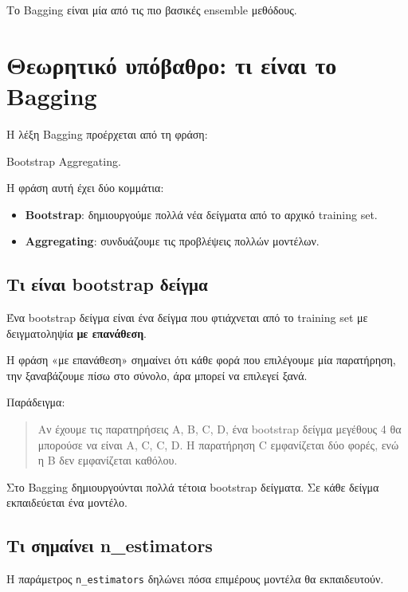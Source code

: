 \documentclass[12pt,a4paper]{article}
\newcommand{\code}[1]{\texttt{\textenglish{#1}}}
\begin{document}
Το Bagging είναι μία από τις πιο βασικές ensemble μεθόδους.

\section{Θεωρητικό υπόβαθρο: τι είναι το Bagging}

Η λέξη Bagging προέρχεται από τη φράση:

\begin{center}
\textenglish{Bootstrap Aggregating}.
\end{center}

Η φράση αυτή έχει δύο κομμάτια:

\begin{itemize}
    \item \textbf{Bootstrap}: δημιουργούμε πολλά νέα δείγματα από το αρχικό
    training set.
    \item \textbf{Aggregating}: συνδυάζουμε τις προβλέψεις πολλών μοντέλων.
\end{itemize}

\subsection{Τι είναι bootstrap δείγμα}

Ένα bootstrap δείγμα είναι ένα δείγμα που φτιάχνεται από το training set με
δειγματοληψία \textbf{με επανάθεση}.

Η φράση «με επανάθεση» σημαίνει ότι κάθε φορά που επιλέγουμε μία παρατήρηση,
την ξαναβάζουμε πίσω στο σύνολο, άρα μπορεί να επιλεγεί ξανά.

Παράδειγμα:

\begin{quote}
Αν έχουμε τις παρατηρήσεις A, B, C, D, ένα bootstrap δείγμα μεγέθους 4 θα
μπορούσε να είναι A, C, C, D. Η παρατήρηση C εμφανίζεται δύο φορές, ενώ η B
δεν εμφανίζεται καθόλου.
\end{quote}

Στο Bagging δημιουργούνται πολλά τέτοια bootstrap δείγματα. Σε κάθε δείγμα
εκπαιδεύεται ένα μοντέλο.

\subsection{Τι σημαίνει n\_estimators}

Η παράμετρος \code{n\_estimators} δηλώνει πόσα επιμέρους μοντέλα θα
εκπαιδευτούν.
\end{document}
